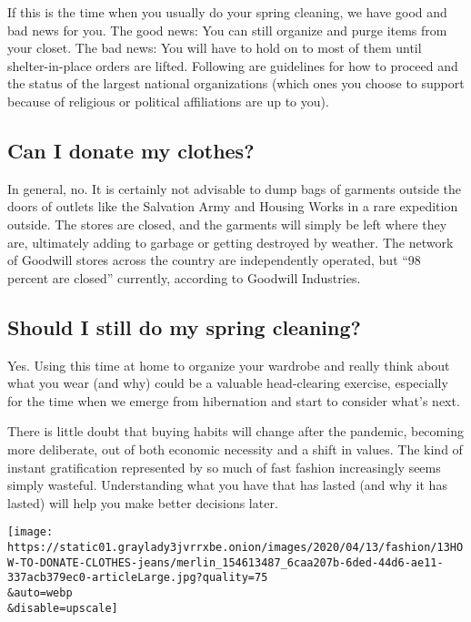 If this is the time when you usually do your spring cleaning, we have
good and bad news for you. The good news: You can still organize and
purge items from your closet. The bad news: You will have to hold on to
most of them until shelter-in-place orders are lifted. Following are
guidelines for how to proceed and the status of the largest national
organizations (which ones you choose to support because of religious or
political affiliations are up to you).

\hypertarget{can-i-donate-my-clothes}{%
\subsection{Can I donate my clothes?}\label{can-i-donate-my-clothes}}

In general, no. It is certainly not advisable to dump bags of garments
outside the doors of outlets like the Salvation Army and Housing Works
in a rare expedition outside. The stores are closed, and the garments
will simply be left where they are, ultimately adding to garbage or
getting destroyed by weather. The network of Goodwill stores across the
country are independently operated, but ``98 percent are closed''
currently, according to Goodwill Industries.

\hypertarget{should-i-still-do-my-spring-cleaning}{%
\subsection{Should I still do my spring
cleaning?}\label{should-i-still-do-my-spring-cleaning}}

Yes. Using this time at home to organize your wardrobe and really think
about what you wear (and why) could be a valuable head-clearing
exercise, especially for the time when we emerge from hibernation and
start to consider what's next.

There is little doubt that buying habits will change after the pandemic,
becoming more deliberate, out of both economic necessity and a shift in
values. The kind of instant gratification represented by so much of fast
fashion increasingly seems simply wasteful. Understanding what you have
that has lasted (and why it has lasted) will help you make better
decisions later.

\texttt{[image: https://static01.graylady3jvrrxbe.onion/images/2020/04/13/fashion/13HOW-TO-DONATE-CLOTHES-jeans/merlin\_154613487\_6caa207b-6ded-44d6-ae11-337acb379ec0-articleLarge.jpg?quality=75\\\&auto=webp\\\&disable=upscale]}

